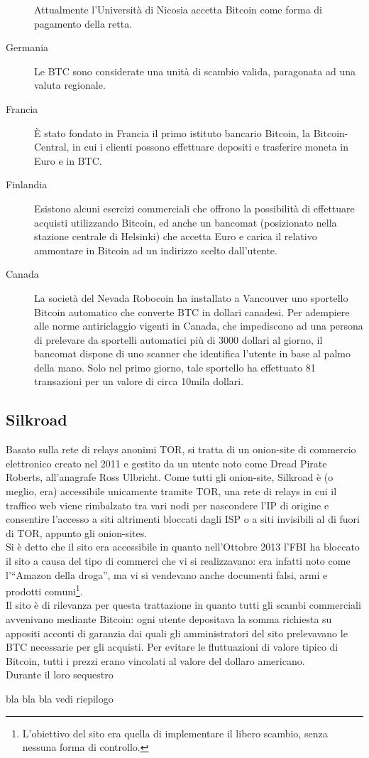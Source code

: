 \begin{description}
 Attualmente l'Università di Nicosia accetta Bitcoin come forma di pagamento della retta.
 \item[Germania] Le BTC sono considerate una unità di scambio valida, paragonata ad una valuta regionale.
 \item[Francia] È stato fondato in Francia il primo istituto bancario Bitcoin, la Bitcoin-Central, in cui i clienti possono effettuare depositi e trasferire moneta in Euro e in BTC.
 \item[Finlandia] Esistono alcuni esercizi commerciali che offrono la possibilità di effettuare acquisti utilizzando Bitcoin, ed anche un bancomat (posizionato nella stazione centrale di Helsinki) che accetta Euro e carica il relativo ammontare in Bitcoin ad un indirizzo scelto dall'utente.
 \item[Canada] La società del Nevada Robocoin ha installato a Vancouver uno sportello Bitcoin automatico che converte BTC in dollari canadesi. Per adempiere alle norme antiriclaggio vigenti in Canada, che impediscono ad una persona di prelevare da sportelli automatici più di 3000 dollari al giorno, il bancomat dispone di uno scanner che identifica l'utente in base al palmo della mano. Solo nel primo giorno, tale sportello ha effettuato 81 transazioni per un valore di circa 10mila dollari.
\end{description}

\subsection{Silkroad}\label{silkroad}

Basato sulla rete di relays anonimi TOR, si tratta di un onion-site di commercio elettronico creato nel 2011 e gestito da un utente noto come Dread Pirate Roberts, all'anagrafe Ross Ulbricht. Come tutti gli onion-site, Silkroad è (o meglio, era) accessibile unicamente tramite TOR, una rete di relays in cui il traffico web viene rimbalzato tra vari nodi per nascondere l'IP di origine e consentire l'accesso a siti altrimenti bloccati dagli ISP o a siti invisibili al di fuori di TOR, appunto gli onion-sites.\\
Si è detto che il sito era accessibile in quanto nell'Ottobre 2013 l'FBI ha bloccato il sito a causa del tipo di commerci che vi si realizzavano: era infatti noto come l'``Amazon della droga'', ma vi si vendevano anche documenti falsi, armi e prodotti comuni\footnote{L'obiettivo del sito era quella di implementare il libero scambio, senza nessuna forma di controllo.}.\\
Il sito è di rilevanza per questa trattazione in quanto tutti gli scambi commerciali avvenivano mediante Bitcoin: ogni utente depositava la somma richiesta su appositi acconti di garanzia dai quali gli amministratori del sito prelevavano le BTC necessarie per gli acquisti. Per evitare le fluttuazioni di valore tipico di Bitcoin, tutti i prezzi erano vincolati al valore del dollaro americano.\\
Durante il loro sequestro

bla bla bla vedi riepilogo